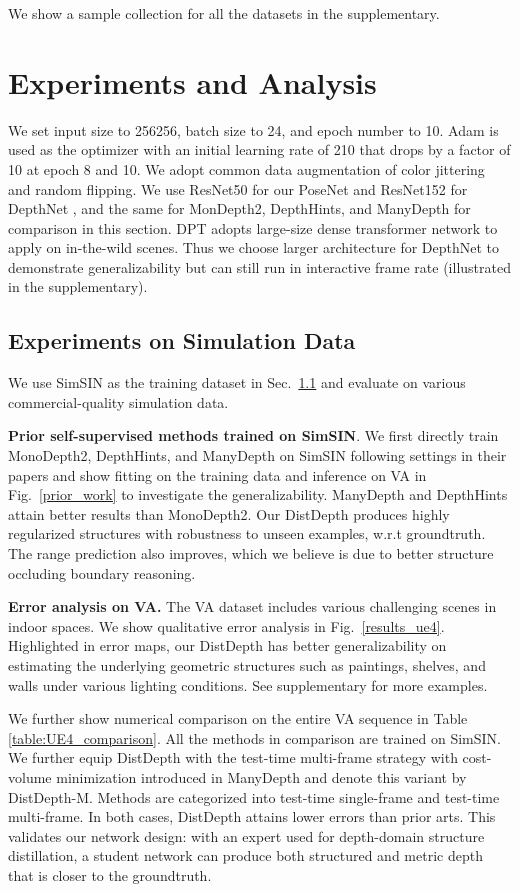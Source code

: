 \documentclass[10pt,twocolumn,letterpaper]{article}
\begin{document}
We show a sample collection for all the datasets in the supplementary.

\section{Experiments and Analysis}
\label{sec:analysis}

We set input size to 256256, batch size to 24, and epoch number to 10. Adam \cite{kingma2014adam} is used as the optimizer with an initial learning rate of 210 that drops by a factor of 10 at epoch 8 and 10. We adopt common data augmentation of color jittering and random flipping. We use ResNet50 for our PoseNet  and ResNet152 for DepthNet , and the same for MonDepth2, DepthHints, and ManyDepth for comparison in this section. DPT adopts large-size dense transformer network to apply on in-the-wild scenes. Thus we choose larger architecture for DepthNet to demonstrate generalizability but can still run in interactive frame rate (illustrated in the supplementary).

\subsection{Experiments on Simulation Data}
\label{sec:exp_sim}
We use SimSIN as the training dataset in Sec.~\ref{sec:exp_sim} and evaluate on various commercial-quality simulation data.

\textbf{Prior self-supervised methods trained on SimSIN}. We first directly train MonoDepth2, DepthHints, and ManyDepth on SimSIN following settings in their papers and show fitting on the training data and inference on VA in Fig.~\ref{prior_work} to investigate the generalizability. ManyDepth and DepthHints attain better results than MonoDepth2. Our DistDepth produces highly regularized structures with  robustness to unseen examples, w.r.t groundtruth. The range prediction also improves, which we believe is due to better structure occluding boundary reasoning.

\textbf{Error analysis on VA.}
The VA dataset includes various challenging scenes in indoor spaces. We show qualitative error analysis in Fig.~\ref{results_ue4}. Highlighted in error maps, our DistDepth has better generalizability on estimating the underlying geometric structures such as paintings, shelves, and walls under various lighting conditions. See supplementary for more examples.

We further show numerical comparison on the entire VA sequence in Table \ref{table:UE4_comparison}. 
All the methods in comparison are trained on SimSIN. We further equip DistDepth with the test-time multi-frame strategy with cost-volume minimization introduced in ManyDepth and denote this variant by DistDepth-M. 
Methods are categorized into test-time single-frame and test-time multi-frame. In both cases, DistDepth attains lower errors than prior arts. This validates our network design: with an expert used for depth-domain structure distillation, a student network  can produce both structured and metric depth that is closer to the groundtruth.
\end{document}
